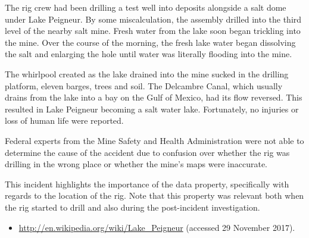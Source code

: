 The rig crew had been drilling a test well into deposits alongside a salt dome under Lake Peigneur. By some miscalculation, the assembly drilled into the third level of the nearby salt mine. Fresh water from the lake soon began trickling into the mine. Over the course of the morning, the fresh lake water began dissolving the salt and enlarging the hole until water was literally flooding into the mine.

The whirlpool created as the lake drained into the mine sucked in the drilling platform, eleven barges, trees and soil. The Delcambre Canal, which usually drains from the lake into a bay on the Gulf of Mexico, had its flow reversed. This resulted in Lake Peigneur becoming a salt water lake. Fortunately, no injuries or loss of human life were reported. 

Federal experts from the Mine Safety and Health Administration were not able to determine the cause of the accident due to confusion over whether the rig was drilling in the wrong place or whether the mine's maps were inaccurate.

This incident highlights the importance of the  \gls{data property}, specifically with regards to the location of the rig. Note that this property was relevant both when the rig started to drill and also during the post-incident investigation.

\begin{samepage}
\begin{itemize}
  \item \raggedright{\href{http://en.wikipedia.org/wiki/Lake_Peigneur}{http://en.wikipedia.org/wiki/Lake\_Peigneur} (accessed 29 November 2017).}
\end{itemize}
\end{samepage}
